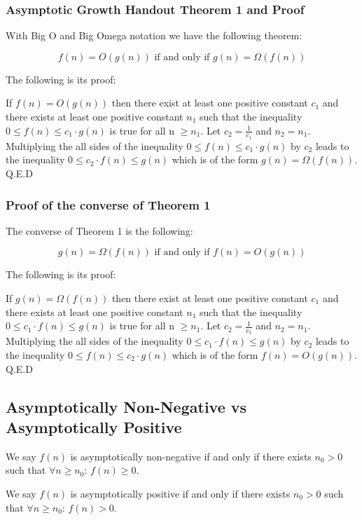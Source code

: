 \documentclass{article}
\begin{document}
\subsubsection{Asymptotic Growth Handout Theorem 1 and Proof}

With Big O and Big Omega notation we have the following theorem: 

$$f(n) = O(g(n)) \text{ if and only if } g(n) = \Omega(f(n))$$

The following is its proof:

If $f(n) = O(g(n))$ then there exist at least one positive constant $c_1$ and there exists at least one positive constant $n_1$ such that the inequality $0 \leq f(n) \leq c_1 \cdot g(n)$ is true for all n $\geq n_1$. Let $c_2 = \frac{1}{c_1}$ and $n_2 = n_1$. Multiplying the all sides of the inequality $0 \leq f(n) \leq c_1 \cdot g(n)$ by $c_2$ leads to the inequality $0 \leq c_2 \cdot f(n) \leq g(n)$ which is of the form $g(n) = \Omega(f(n))$. 
Q.E.D 

\subsubsection{Proof of the converse of Theorem 1}

The converse of Theorem 1 is the following:

$$g(n) = \Omega(f(n)) \text{ if and only if } f(n) = O(g(n))$$

The following is its proof:

If $g(n) = \Omega(f(n))$ then there exist at least one positive constant $c_1$ and there exists at least one positive constant $n_1$ such that the inequality $0 \leq c_1 \cdot f(n) \leq g(n)$ is true for all n $\geq n_1$. Let $c_2 = \frac{1}{c_1}$ and $n_2 = n_1$. Multiplying the all sides of the inequality $0 \leq c_1 \cdot f(n) \leq g(n)$ by $c_2$ leads to the inequality $0 \leq f(n) \leq c_2 \cdot g(n)$ which is of the form $f(n) = O(g(n))$. 
Q.E.D 

\subsection{Asymptotically Non-Negative vs Asymptotically Positive}

We say $f(n)$ is asymptotically non-negative if and only if there exists $n_0 > 0$ such that $\forall n \ge n_0$: $f(n) \ge 0$.

We say $f(n)$ is asymptotically positive if and only if there exists $n_0 > 0$ such that $\forall n \ge n_0$: $f(n) > 0$.
\end{document}
